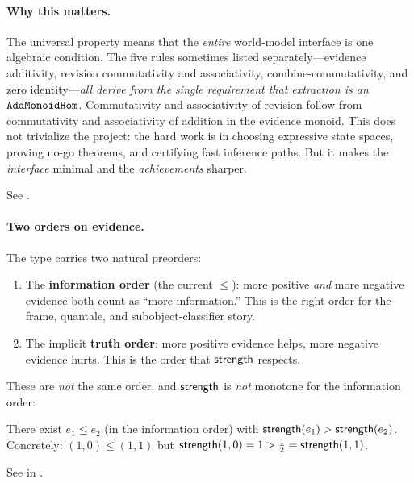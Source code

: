 \documentclass[11pt,openany]{report}
\begin{document}
\paragraph{Why this matters.}
The universal property means that the \emph{entire} world-model
interface is one algebraic condition.  The five rules sometimes listed
separately---evidence additivity, revision commutativity and
associativity, combine-commutativity, and zero
identity---\emph{all derive from the single requirement that
extraction is an $\texttt{AddMonoidHom}$}.  Commutativity and
associativity of revision follow from commutativity and associativity
of addition in the evidence monoid.  This does not trivialize the
project: the hard work is in choosing expressive state spaces, proving
no-go theorems, and certifying fast inference paths.  But it makes the
\emph{interface} minimal and the \emph{achievements} sharper.

See .

\paragraph{Two orders on evidence.}
The \Evidence{} type carries two natural preorders:
\begin{enumerate}
\item The \textbf{information order} (the current $\le$): more positive
  \emph{and} more negative evidence both count as ``more information.''
  This is the right order for the frame, quantale, and
  subobject-classifier story.
\item The implicit \textbf{truth order}: more positive evidence helps,
  more negative evidence hurts.  This is the order that $\mathsf{strength}$
  respects.
\end{enumerate}

\noindent
These are \emph{not} the same order, and $\mathsf{strength}$ is \emph{not}
monotone for the information order:

\begin{theorem}
\label{thm:strength-not-monotone}
There exist $e_1 \le e_2$ (in the information order) with
$\mathsf{strength}(e_1) > \mathsf{strength}(e_2)$.  Concretely:
$(1, 0) \le (1, 1)$ but $\mathsf{strength}(1, 0) = 1 > \tfrac{1}{2} =
\mathsf{strength}(1, 1)$.
\end{theorem}

\noindent
See  in
.
\end{document}
